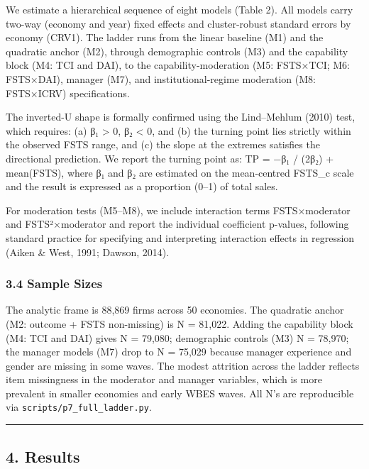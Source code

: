 \documentclass[
  12pt,a4paper]{article}
\begin{document}
We estimate a hierarchical sequence of eight models (Table 2). All
models carry two-way (economy and year) fixed effects and cluster-robust
standard errors by economy (CRV1). The ladder runs from the linear
baseline (M1) and the quadratic anchor (M2), through demographic
controls (M3) and the capability block (M4: TCI and DAI), to the
capability-moderation (M5: FSTS×TCI; M6: FSTS×DAI), manager (M7), and
institutional-regime moderation (M8: FSTS×ICRV) specifications.

The inverted-U shape is formally confirmed using the Lind--Mehlum (2010)
test, which requires: (a) β₁ \textgreater{} 0, β₂ \textless{} 0, and (b)
the turning point lies strictly within the observed FSTS range, and (c)
the slope at the extremes satisfies the directional prediction. We
report the turning point as: TP = −β₁ / (2β₂) + mean(FSTS), where β₁ and
β₂ are estimated on the mean-centred FSTS\_c scale and the result is
expressed as a proportion (0--1) of total sales.

For moderation tests (M5--M8), we include interaction terms
FSTS×moderator and FSTS²×moderator and report the individual coefficient
p-values, following standard practice for specifying and interpreting
interaction effects in regression (Aiken \& West, 1991; Dawson, 2014).

\hypertarget{sample-sizes}{%
\subsubsection{3.4 Sample Sizes}\label{sample-sizes}}

The analytic frame is 88,869 firms across 50 economies. The quadratic
anchor (M2: outcome + FSTS non-missing) is N = 81,022. Adding the
capability block (M4: TCI and DAI) gives N = 79,080; demographic
controls (M3) N = 78,970; the manager models (M7) drop to N = 75,029
because manager experience and gender are missing in some waves. The
modest attrition across the ladder reflects item missingness in the
moderator and manager variables, which is more prevalent in smaller
economies and early WBES waves. All N's are reproducible via
\texttt{scripts/p7\_full\_ladder.py}.

\begin{center}\rule{0.5\linewidth}{0.5pt}\end{center}

\hypertarget{results}{%
\subsection{4. Results}\label{results}}
\end{document}
